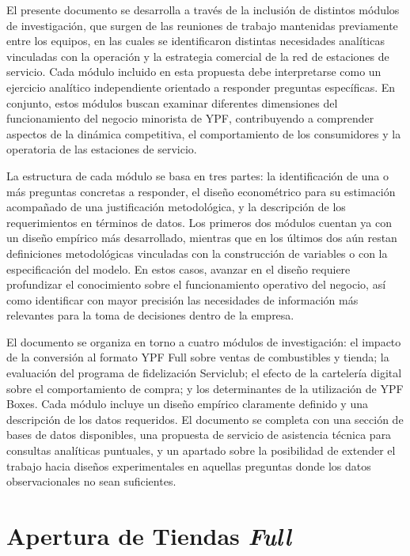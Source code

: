 \documentclass[12pt]{article}
\begin{document}
El presente documento se desarrolla a través de la inclusión de distintos módulos de investigación, que surgen de las reuniones de trabajo mantenidas previamente entre los equipos, en las cuales se identificaron distintas necesidades analíticas vinculadas con la operación y la estrategia comercial de la red de estaciones de servicio. Cada módulo incluido en esta propuesta debe interpretarse como un ejercicio analítico independiente orientado a responder preguntas específicas. En conjunto, estos módulos buscan examinar diferentes dimensiones del funcionamiento del negocio minorista de YPF, contribuyendo a comprender aspectos de la dinámica competitiva, el comportamiento de los consumidores y la operatoria de las estaciones de servicio.

La estructura de cada módulo se basa en tres partes: la identificación de una o más preguntas concretas a responder, el diseño econométrico para su estimación acompañado de una justificación metodológica, y la descripción de los requerimientos en términos de datos. Los primeros dos módulos cuentan ya con un diseño empírico más desarrollado, mientras que en los últimos dos aún restan definiciones metodológicas vinculadas con la construcción de variables o con la especificación del modelo. En estos casos, avanzar en el diseño requiere profundizar el conocimiento sobre el funcionamiento operativo del negocio, así como identificar con mayor precisión las necesidades de información más relevantes para la toma de decisiones dentro de la empresa.

El documento se organiza en torno a cuatro módulos de investigación: el impacto  de la conversión al formato YPF Full sobre ventas de combustibles y tienda; la evaluación del programa de fidelización Serviclub; el efecto de la cartelería  digital sobre el comportamiento de compra; y los determinantes de la utilización  de YPF Boxes. Cada módulo incluye un diseño empírico claramente definido y una  descripción de los datos requeridos. El documento se completa con una sección de  bases de datos disponibles, una propuesta de servicio de asistencia técnica para consultas analíticas puntuales, y un apartado sobre la posibilidad de extender  el trabajo hacia diseños experimentales en aquellas preguntas donde los datos  observacionales no sean suficientes.


\section{Apertura de Tiendas \emph{Full}}

\end{document}
